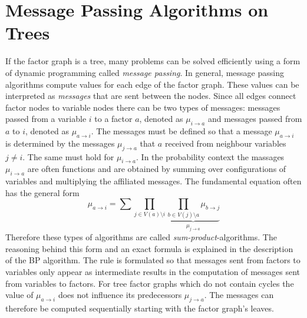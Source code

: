 
\section{Message Passing Algorithms on Trees}

If the factor graph is a tree, many problems can be solved efficiently using a form of dynamic programming called \emph{message passing}. \newline 
In general, message passing algorithms compute values for each edge of the factor graph. These values can be interpreted as \emph{messages} that are sent between the nodes. Since all edges connect factor nodes to variable nodes there can be two types of messages: messages passed from a variable $i$ to a factor $a$, denoted as $\mu_{i \rightarrow a}$ and messages passed from $a$ to $i$, denoted as $\mu_{a \rightarrow i}$. \newline
The messages must be defined so that a message $\mu_{a \rightarrow i}$ is determined by the messages $\mu_{j \rightarrow a}$ that $a$ received from neighbour variables $j \neq i$. 
The same must hold for $\mu_{i \rightarrow a}$. \newline
In the probability context the massages $\mu_{i \rightarrow a}$ are often functions and are obtained by summing over configurations of  variables and multiplying the affiliated messages. The fundamental equation often has the general form $$ \mu_{a \rightarrow i} = \sum\prod_{j \in V(a) \setminus i} \underbrace{\prod_{b \in V(j) \setminus a} \mu_{b \rightarrow j}}_{\mu_{j \rightarrow a}}$$ Therefore these types of algorithms are called \emph{sum-product}-algorithms. The reasoning behind this form and an exact formula is explained in the description of the BP algorithm. The rule is formulated so that messages sent from factors to variables only appear as intermediate results in the computation of messages sent from variables to factors. \newline
For tree factor graphs which do not contain cycles the value of $\mu_{a \rightarrow i}$ does not influence its predecessors $\mu_{j \rightarrow a}$. The messages can therefore be computed sequentially starting with the factor graph's leaves.


